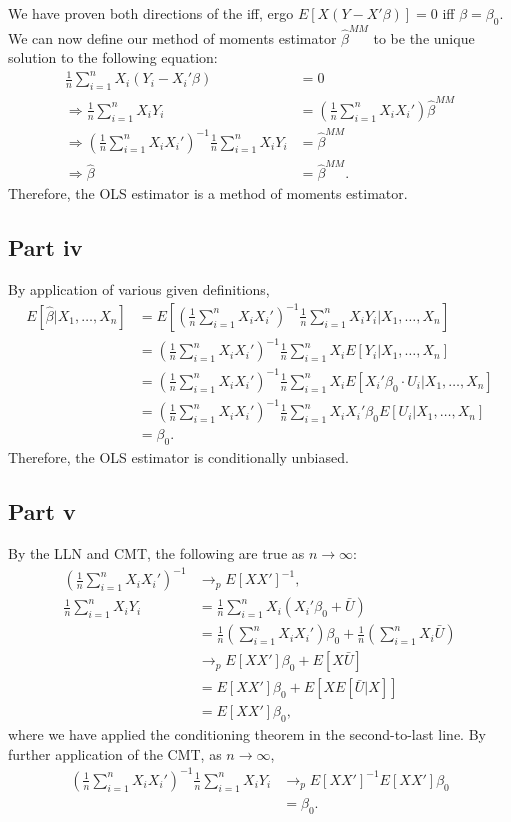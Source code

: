 \documentclass[11pt]{article} %
\begin{document}
We have proven both directions of the iff, ergo $E[X(Y-X'\beta)] = 0$ iff $\beta = \beta_0$. We can now define our method of moments estimator $\hat{\beta}^{MM}$ to be the unique solution to the following equation:
\begin{align*}
\frac{1}{n}\sum_{i=1}^n X_i(Y_i-X_i'\beta) &= 0\\
\Rightarrow \frac{1}{n}\sum_{i=1}^n X_iY_i &= \left(\frac{1}{n}\sum_{i=1}^n X_i X_i'\right)\hat{\beta}^{MM}\\
\Rightarrow  \left(\frac{1}{n}\sum_{i=1}^n X_i X_i'\right)^{-1}\frac{1}{n}\sum_{i=1}^n X_iY_i &=\hat{\beta}^{MM} \\
\Rightarrow \hat{\beta} &= \hat{\beta}^{MM}.
\end{align*}
Therefore, the OLS estimator is a method of moments estimator.
\subsection{Part iv}
By application of various given definitions,
\begin{align*}
E[\hat{\beta}|X_1,\dots,X_n] &= E\left[\left(\frac{1}{n}\sum_{i=1}^n X_i X_i'\right)^{-1}\frac{1}{n}\sum_{i=1}^n X_iY_i|X_1,\dots,X_n\right]\\
&= \left(\frac{1}{n}\sum_{i=1}^n X_i X_i'\right)^{-1}\frac{1}{n}\sum_{i=1}^n X_iE[Y_i|X_1,\dots,X_n]\\
&= \left(\frac{1}{n}\sum_{i=1}^n X_i X_i'\right)^{-1}\frac{1}{n}\sum_{i=1}^n X_iE[X_i'\beta_0\cdot U_i|X_1,\dots,X_n]\\
&= \left(\frac{1}{n}\sum_{i=1}^n X_i X_i'\right)^{-1}\frac{1}{n}\sum_{i=1}^n X_iX_i'\beta_0 E[U_i|X_1,\dots,X_n]\\
&= \beta_0.
\end{align*}
Therefore, the OLS estimator is conditionally unbiased.

\subsection{Part v}
By the LLN and CMT, the following are true as $n\rightarrow \infty$:
\begin{align*}
 \left(\frac{1}{n}\sum_{i=1}^n X_i X_i'\right)^{-1} &\rightarrow_p E[XX']^{-1},\\
\frac{1}{n}\sum_{i=1}^n X_i Y_i &= \frac{1}{n}\sum_{i=1}^n X_i (X_i'\beta_0 + \bar{U})\\
&= \frac{1}{n}\left(\sum_{i=1}^nX_i X_i' \right)\beta_0 +  \frac{1}{n}\left(\sum_{i=1}^nX_i \bar{U}\right)\\
&\rightarrow_p E[XX']\beta_0 + E[X \bar{U}]\\
&=  E[XX']\beta_0 + E[X E[\bar{U}|X]]\\
&=  E[XX']\beta_0,
\end{align*}
where we have applied the conditioning theorem in the second-to-last line. By further application of the CMT, as $n\rightarrow \infty$,
\begin{align*}
 \left(\frac{1}{n}\sum_{i=1}^n X_i X_i'\right)^{-1}\frac{1}{n}\sum_{i=1}^n X_iY_i &\rightarrow_p E[XX']^{-1}E[XX']\beta_0\\
&= \beta_0.
\end{align*}
\end{document}
